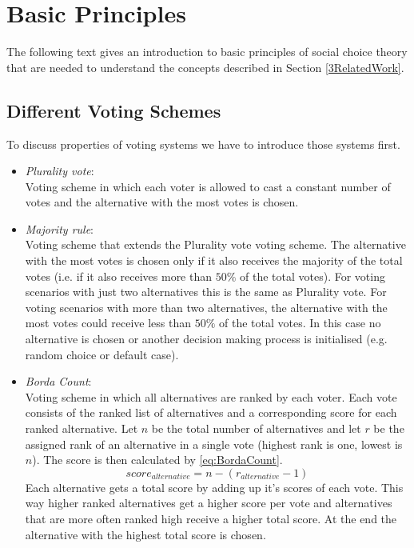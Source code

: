 \documentclass[conference]{IEEEtran}
\begin{document}
\section{Basic Principles}\label{2BasicPrinciples}
The following text gives an introduction to basic principles of social choice theory that are needed to understand the concepts described in Section \ref{3RelatedWork}.
\subsection{Different Voting Schemes}
To discuss properties of voting systems we have to introduce those systems first.
\begin{itemize}
    \item \textit{Plurality vote}:\\
    Voting scheme in which each voter is allowed to cast a constant number of votes and the alternative with the most votes is chosen.

    \item \textit{Majority rule}:\\
    Voting scheme that extends the Plurality vote voting scheme. The alternative with the most votes is chosen only if it also receives the majority of the total votes (i.e. if it also receives more than $50\%$ of the total votes). For voting scenarios with just two alternatives this is the same as Plurality vote. For voting scenarios with more than two alternatives, the alternative with the most votes could receive less than $50\%$ of the total votes. In this case no alternative is chosen or another decision making process is initialised (e.g. random choice or default case).

    \item \textit{Borda Count}:\\
    Voting scheme in which all alternatives are ranked by each voter. Each vote consists of the ranked list of alternatives and a corresponding score for each ranked alternative. Let $n$ be the total number of alternatives and let $r$ be the assigned rank of an alternative in a single vote (highest rank is one, lowest is $n$). The score is then calculated by \eqref{eq:BordaCount}.
    \begin{equation}\label{eq:BordaCount}
        score_{alternative}=n-(r_{alternative}-1)
    \end{equation}
    Each alternative gets a total score by adding up it's scores of each vote. This way higher ranked alternatives get a higher score per vote and alternatives that are more often ranked high receive a higher total score. At the end the alternative with the highest total score is chosen.
\end{itemize}
\end{document}
